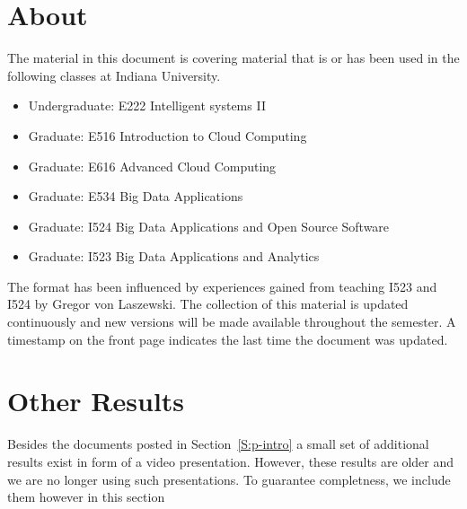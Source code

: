 \section{About}

The material in this document is covering material that is or has been
used in the following classes at Indiana University.

\begin{itemize}
\item Undergraduate: E222 Intelligent systems II
\item Graduate: E516 Introduction to Cloud Computing
\item Graduate: E616 Advanced Cloud Computing
\item Graduate: E534 Big Data Applications
\item Graduate: I524 Big Data Applications and Open Source Software
\item Graduate: I523 Big Data Applications and Analytics
\end{itemize}

The format has been influenced by experiences gained from teaching I523
and I524 by Gregor von Laszewski.  The collection of this material is
updated continuously and new versions will be made available
throughout the semester. A timestamp on the front page indicates the
last time the document was updated.

\section{Other Results}\label{S:results}

Besides the documents posted in Section~\ref{S:p-intro} a small set of
additional results exist in form of a video presentation.  However,
these results are older and we are no longer using such
presentations. To guarantee completness, we include them however in
this section







